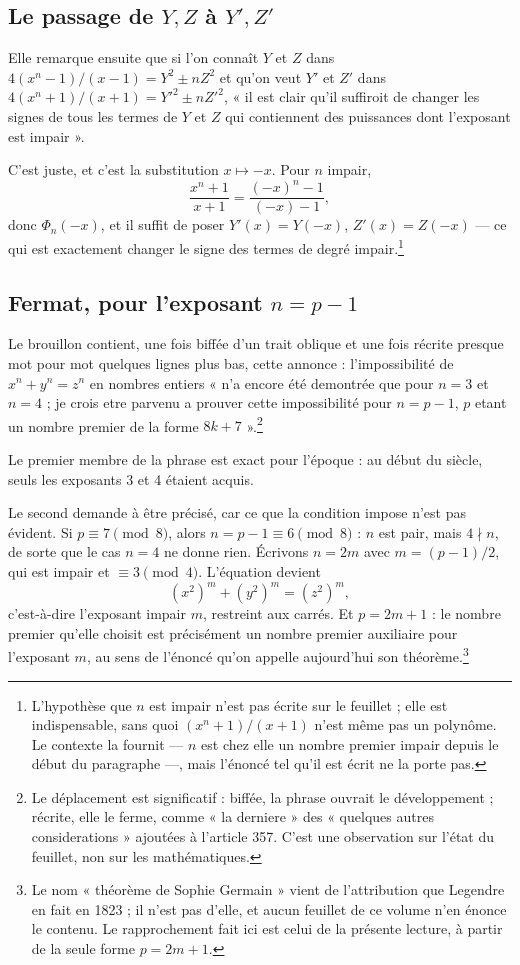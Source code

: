 \documentclass[11pt,a4paper]{article}
\begin{document}
\subsection*{Le passage de $Y, Z$ à $Y', Z'$}

Elle remarque ensuite que si l'on connaît $Y$ et $Z$ dans
$4(x^n-1)/(x-1) = Y^2 \pm nZ^2$ et qu'on veut $Y'$ et $Z'$ dans
$4(x^n+1)/(x+1) = Y'^2 \pm nZ'^2$, « il est clair qu'il suffiroit de changer
les signes de tous les termes de $Y$ et $Z$ qui contiennent des puissances
dont l'exposant est impair ».

C'est juste, et c'est la substitution $x \mapsto -x$. Pour $n$ impair,
\[
  \frac{x^n+1}{x+1} = \frac{(-x)^n - 1}{(-x) - 1},
\]
donc $\Phi_n(-x)$, et il suffit de poser $Y'(x) = Y(-x)$, $Z'(x) = Z(-x)$ —
ce qui est exactement changer le signe des termes de degré
impair.\footnote{L'hypothèse que $n$ est impair n'est pas écrite sur le
feuillet ; elle est indispensable, sans quoi $(x^n+1)/(x+1)$ n'est même pas un
polynôme. Le contexte la fournit — $n$ est chez elle un nombre premier impair
depuis le début du paragraphe —, mais l'énoncé tel qu'il est écrit ne la
porte pas.}

\subsection*{Fermat, pour l'exposant $n = p - 1$}

Le brouillon contient, une fois biffée d'un trait oblique et une fois récrite
presque mot pour mot quelques lignes plus bas, cette annonce :
l'impossibilité de $x^n + y^n = z^n$ en nombres entiers « n'a encore été
demontrée que pour $n = 3$ et $n = 4$ ; je crois etre parvenu a prouver cette
impossibilité pour $n = p-1$, $p$ etant un nombre premier de la forme
$8k+7$ ».\footnote{Le déplacement est significatif : biffée, la phrase ouvrait
le développement ; récrite, elle le ferme, comme « la derniere » des
« quelques autres considerations » ajoutées à l'article 357. C'est une
observation sur l'état du feuillet, non sur les mathématiques.}

Le premier membre de la phrase est exact pour l'époque : au début du siècle,
seuls les exposants 3 et 4 étaient acquis.

Le second demande à être précisé, car ce que la condition impose n'est pas
évident. Si $p \equiv 7 \pmod 8$, alors $n = p-1 \equiv 6 \pmod 8$ : $n$ est
pair, mais $4 \nmid n$, de sorte que le cas $n=4$ ne donne rien. Écrivons
$n = 2m$ avec $m = (p-1)/2$, qui est impair et $\equiv 3 \pmod 4$. L'équation
devient
\[
  (x^2)^m + (y^2)^m = (z^2)^m ,
\]
c'est-à-dire l'exposant impair $m$, restreint aux carrés. Et $p = 2m+1$ : le
nombre premier qu'elle choisit est précisément un nombre premier auxiliaire
pour l'exposant $m$, au sens de l'énoncé qu'on appelle aujourd'hui son
théorème.\footnote{Le nom « théorème de Sophie Germain » vient de
l'attribution que Legendre en fait en 1823 ; il n'est pas d'elle, et aucun
feuillet de ce volume n'en énonce le contenu. Le rapprochement fait ici est
celui de la présente lecture, à partir de la seule forme $p = 2m+1$.}
\end{document}

